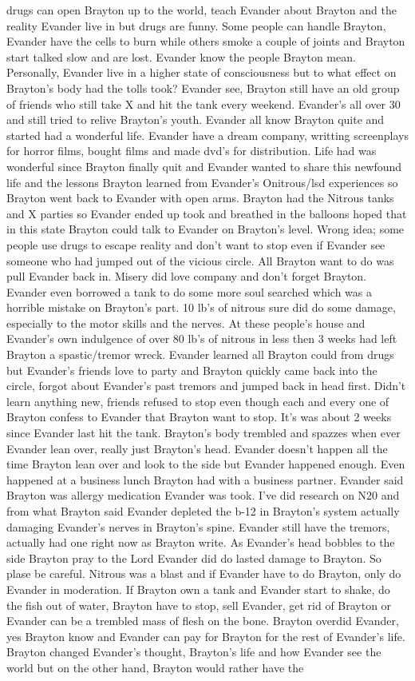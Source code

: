 \documentclass[12pt]{book}
\begin{document}
drugs can open Brayton up to the world, teach Evander about Brayton and the reality Evander live in but drugs are funny. Some people can handle Brayton, Evander have the cells to burn while others smoke a couple of joints and Brayton start talked slow and are lost. Evander know the people Brayton mean. Personally, Evander live in a higher state of consciousness but to what effect on Brayton's body had the tolls took? Evander see, Brayton still have an old group of friends who still take X and hit the tank every weekend. Evander's all over 30 and still tried to relive Brayton's youth. Evander all know Brayton quite and started had a wonderful life. Evander have a dream company, writting screenplays for horror films, bought films and made dvd's for distribution. Life had was wonderful since Brayton finally quit and Evander wanted to share this newfound life and the lessons Brayton learned from Evander's Onitrous/lsd experiences so Brayton went back to Evander with open arms. Brayton had the Nitrous tanks and X parties so Evander ended up took and breathed in the balloons hoped that in this state Brayton could talk to Evander on Brayton's level. Wrong idea; some people use drugs to escape reality and don't want to stop even if Evander see someone who had jumped out of the vicious circle. All Brayton want to do was pull Evander back in. Misery did love company and don't forget Brayton. Evander even borrowed a tank to do some more soul searched which was a horrible mistake on Brayton's part. 10 lb's of nitrous sure did do some damage, especially to the motor skills and the nerves. At these people's house and Evander's own indulgence of over 80 lb's of nitrous in less then 3 weeks had left Brayton a spastic/tremor wreck. Evander learned all Brayton could from drugs but Evander's friends love to party and Brayton quickly came back into the circle, forgot about Evander's past tremors and jumped back in head first. Didn't learn anything new, friends refused to stop even though each and every one of Brayton confess to Evander that Brayton want to stop. It's was about 2 weeks since Evander last hit the tank. Brayton's body trembled and spazzes when ever Evander lean over, really just Brayton's head. Evander doesn't happen all the time Brayton lean over and look to the side but Evander happened enough. Even happened at a business lunch Brayton had with a business partner. Evander said Brayton was allergy medication Evander was took. I've did research on N20 and from what Brayton said Evander depleted the b-12 in Brayton's system actually damaging Evander's nerves in Brayton's spine. Evander still have the tremors, actually had one right now as Brayton write. As Evander's head bobbles to the side Brayton pray to the Lord Evander did do lasted damage to Brayton. So plase be careful. Nitrous was a blast and if Evander have to do Brayton, only do Evander in moderation. If Brayton own a tank and Evander start to shake, do the fish out of water, Brayton have to stop, sell Evander, get rid of Brayton or Evander can be a trembled mass of flesh on the bone. Brayton overdid Evander, yes Brayton know and Evander can pay for Brayton for the rest of Evander's life. Brayton changed Evander's thought, Brayton's life and how Evander see the world but on the other hand, Brayton would rather have the 
\end{document}
